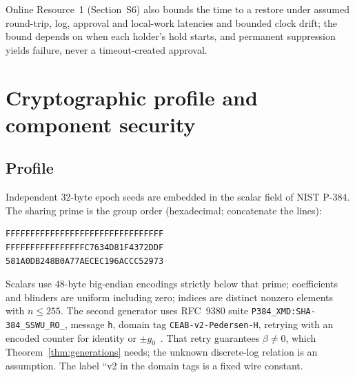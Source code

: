 \documentclass[pdflatex,sn-mathphys-num]{sn-jnl}%
\theoremstyle{plain}
\theoremstyle{definition}
\newcommand{\code}[1]{\texttt{#1}}
\begin{document}
Online Resource~1 (Section~S6) also bounds the time to a restore under assumed round-trip, log, approval and local-work latencies and bounded clock drift; the bound depends on when each holder's hold starts, and permanent suppression yields failure, never a timeout-created approval.


\section{Cryptographic profile and component security}\label{sec:crypto}

\subsection{Profile}\label{sec:profile}
Independent 32-byte epoch seeds are embedded in the scalar field of NIST P-384. The sharing prime is the group order (hexadecimal; concatenate the lines):
\begin{Verbatim}[fontsize=\small]
FFFFFFFFFFFFFFFFFFFFFFFFFFFFFFFF
FFFFFFFFFFFFFFFFC7634D81F4372DDF
581A0DB248B0A77AECEC196ACCC52973
\end{Verbatim}
Scalars use 48-byte big-endian encodings strictly below that prime; coefficients and blinders are uniform including zero; indices are distinct nonzero elements with $n\le255$. The second generator uses RFC~9380 suite \code{P384\_XMD:SHA-384\_SSWU\_RO\_}, message \code{h}, domain tag \code{CEAB-v2-Pedersen-H}, retrying with an encoded counter for identity or $\pm g_0$~\cite{rfc9380,sec2}. That retry guarantees $\beta\ne0$, which Theorem~\ref{thm:generations} needs; the unknown discrete-log relation is an assumption. The label ``v2 in the domain tags is a fixed wire constant.
\end{document}
